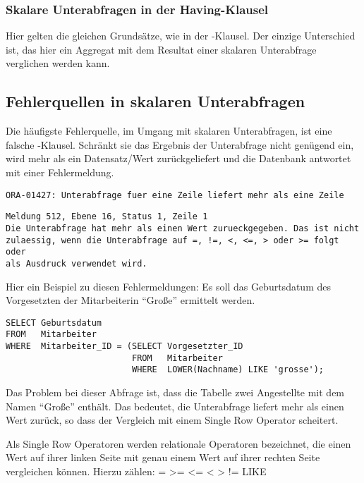         \subsubsection{Skalare Unterabfragen in der Having-Klausel}
        Hier gelten die gleichen Grundsätze, wie in der \WHERE-Klausel. Der einzige Unterschied ist, das hier ein Aggregat mit dem Resultat einer skalaren Unterabfrage verglichen werden kann.
      \subsection{Fehlerquellen in skalaren Unterabfragen}
        Die häufigste Fehlerquelle, im Umgang mit skalaren Unterabfragen, ist eine falsche \WHERE-Klausel. Schränkt sie das Ergebnis der Unterabfrage nicht genügend ein, wird mehr als ein Datensatz/Wert zurückgeliefert und die Datenbank antwortet mit einer Fehlermeldung.
          \begin{lstlisting}[language=oracle_sql,caption={Mehr als eine Zeile: Fehlermeldung in Oracle},label=sql06_04]
ORA-01427: Unterabfrage fuer eine Zeile liefert mehr als eine Zeile
          \end{lstlisting}
          \begin{lstlisting}[language=ms_sql,caption={Mehr als eine Zeile: Fehlermeldung in SQL Server},label=sql06_05]
Meldung 512, Ebene 16, Status 1, Zeile 1
Die Unterabfrage hat mehr als einen Wert zurueckgegeben. Das ist nicht
zulaessig, wenn die Unterabfrage auf =, !=, <, <=, > oder >= folgt oder
als Ausdruck verwendet wird.
          \end{lstlisting}
          Hier ein Beispiel zu diesen Fehlermeldungen: Es soll das Geburtsdatum des Vorgesetzten der Mitarbeiterin \enquote{Große} ermittelt werden.
          \begin{lstlisting}[language=oracle_sql,caption={Eine Single Row Unterabfrage mit Problemen!},label=sql06_06]
SELECT Geburtsdatum
FROM   Mitarbeiter
WHERE  Mitarbeiter_ID = (SELECT Vorgesetzter_ID
                         FROM   Mitarbeiter
                         WHERE  LOWER(Nachname) LIKE 'grosse');
          \end{lstlisting}
          Das Problem bei dieser Abfrage ist, dass die Tabelle  zwei Angestellte mit dem Namen \enquote{Große} enthält. Das bedeutet, die Unterabfrage liefert mehr als einen Wert zurück, so dass der Vergleich mit einem Single Row Operator scheitert.

          \begin{merke}
            Als Single Row Operatoren werden relationale Operatoren bezeichnet, die einen Wert auf ihrer linken Seite mit genau einem Wert auf ihrer rechten Seite vergleichen können. Hierzu zählen: = >= <= < > != LIKE
          \end{merke}
